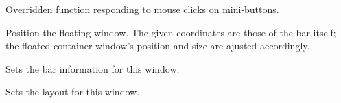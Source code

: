 
Overridden function responding to mouse clicks on mini-buttons.


\label{cbfloatedbarwindowpositionfloatedwnd}


Position the floating window. The given coordinates
are those of the bar itself; the floated container window's
position and size are ajusted accordingly.


\label{cbfloatedbarwindowsetbar}


Sets the bar information for this window.


\label{cbfloatedbarwindowsetlayout}


Sets the layout for this window.

